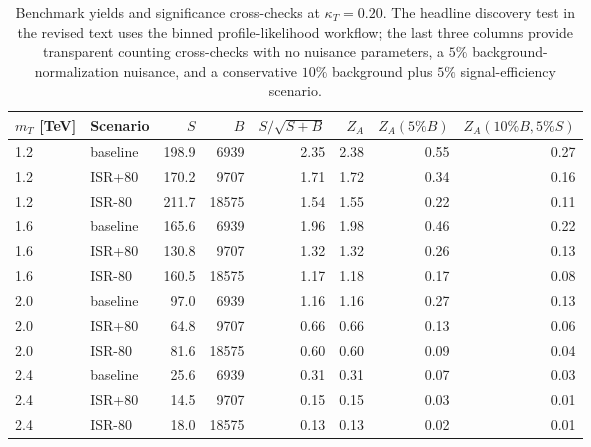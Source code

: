 \begin{table}[t]
\centering
\caption{Benchmark yields and significance cross-checks at $\kappa_T=0.20$.
The headline discovery test in the revised text uses the binned profile-likelihood workflow; the
last three columns provide transparent counting cross-checks with no nuisance parameters, a
$5\%$ background-normalization nuisance, and a conservative $10\%$ background plus $5\%$
signal-efficiency scenario.}
\label{tab:benchmark-yields}
\begin{tabular}{llrrrrrr}
\toprule
$m_T$ [TeV] & Scenario & $S$ & $B$ & $S/\sqrt{S+B}$ & $Z_A$ & $Z_A(5\%B)$ & $Z_A(10\%B,5\%S)$ \\
\midrule
    1.2 & baseline & 198.9 & 6939 & 2.35 & 2.38 & 0.55 & 0.27 \\
    1.2 & ISR+80 & 170.2 & 9707 & 1.71 & 1.72 & 0.34 & 0.16 \\
    1.2 & ISR-80 & 211.7 & 18575 & 1.54 & 1.55 & 0.22 & 0.11 \\
    1.6 & baseline & 165.6 & 6939 & 1.96 & 1.98 & 0.46 & 0.22 \\
    1.6 & ISR+80 & 130.8 & 9707 & 1.32 & 1.32 & 0.26 & 0.13 \\
    1.6 & ISR-80 & 160.5 & 18575 & 1.17 & 1.18 & 0.17 & 0.08 \\
    2.0 & baseline & 97.0 & 6939 & 1.16 & 1.16 & 0.27 & 0.13 \\
    2.0 & ISR+80 & 64.8 & 9707 & 0.66 & 0.66 & 0.13 & 0.06 \\
    2.0 & ISR-80 & 81.6 & 18575 & 0.60 & 0.60 & 0.09 & 0.04 \\
    2.4 & baseline & 25.6 & 6939 & 0.31 & 0.31 & 0.07 & 0.03 \\
    2.4 & ISR+80 & 14.5 & 9707 & 0.15 & 0.15 & 0.03 & 0.01 \\
    2.4 & ISR-80 & 18.0 & 18575 & 0.13 & 0.13 & 0.02 & 0.01 \\
\bottomrule
\end{tabular}
\end{table}
